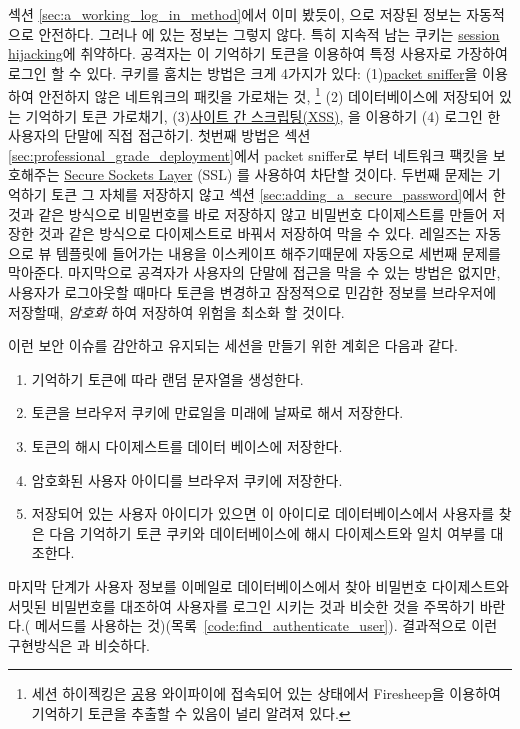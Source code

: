 섹션 \ref{sec:a_working_log_in_method}에서 이미 봤듯이, 으로 저장된 정보는 자동적으로 안전하다. 그러나 에 있는 정보는 그렇지 않다. 특히 지속적 남는 쿠키는 \href{http://en.wikipedia.org/wiki/Session_hijacking}{session hijacking}에 취약하다. 공격자는 이 기억하기 토큰을 이용하여 특정 사용자로 가장하여 로그인 할 수 있다. 쿠키를 훔치는 방법은 크게 4가지가 있다: (1)\href{https://en.wikipedia.org/wiki/Packet_analyzer}{packet sniffer}을 이용하여 안전하지 않은 네트워크의 패킷을 가로채는 것, \footnote{세션 하이젝킹은 \href{http://codebutler.com/firesheep}공용 와이파이에 접속되어 있는 상태에서 {Firesheep}을 이용하여 기억하기 토큰을 추출할 수 있음이 널리 알려져 있다.} (2) 데이터베이스에 저장되어 있는 기억하기 토큰 가로채기,  (3)\href{http://en.wikipedia.org/wiki/Cross-site_scripting}{사이트 간 스크립팅(XSS)}, 을 이용하기 (4) 로그인 한 사용자의 단말에 직접 접근하기. 첫번째 방법은 섹션 \ref{sec:professional_grade_deployment}에서 packet sniffer로 부터 네트워크 팩킷을 보호해주는 \href{https://en.wikipedia.org/wiki/Transport_Layer_Security}{Secure Sockets Layer} (SSL) 를 사용하여 차단할 것이다. 두번째 문제는 기억하기 토큰 그 자체를 저장하지 않고  섹션 \ref{sec:adding_a_secure_password}에서 한 것과 같은 방식으로 비밀번호를 바로 저장하지 않고 비밀번호 다이제스트를 만들어 저장한 것과 같은 방식으로 다이제스트로 바꿔서 저장하여 막을 수 있다. 레일즈는 자동으로 뷰 템플릿에 들어가는 내용을 이스케이프 해주기때문에 자동으로 세번째 문제를 막아준다. 마지막으로 공격자가 사용자의 단말에 접근을 막을 수 있는 방법은 없지만, 사용자가 로그아웃할 때마다 토큰을 변경하고 잠정적으로 민감한 정보를 브라우저에 저장할때, \emph{암호화 }하여 저장하여 위험을 최소화 할 것이다. 

이런 보안 이슈를 감안하고 유지되는 세션을 만들기 위한 계회은 다음과 같다. 

\begin{enumerate} \item 기억하기 토큰에 따라 랜덤 문자열을 생성한다. \item 토큰을 브라우저 쿠키에 만료일을 미래에 날짜로 해서 저장한다. \item 토큰의 해시 다이제스트를 데이터 베이스에 저장한다. \item 암호화된 사용자 아이디를 브라우저 쿠키에 저장한다. \item 저장되어 있는 사용자 아이디가 있으면 이 아이디로 데이터베이스에서 사용자를 찾은 다음 기억하기 토큰 쿠키와 데이터베이스에 해시 다이제스트와 일치 여부를 대조한다. \end{enumerate} 

\noindent 마지막 단계가 사용자 정보를 이메일로 데이터베이스에서 찾아 비밀번호 다이제스트와 서밋된 비밀번호를 대조하여 사용자를 로그인 시키는 것과 비슷한 것을 주목하기 바란다.( 메서드를 사용하는 것)(목록~\ref{code:find_authenticate_user}). 결과적으로 이런 구현방식은 과 비슷하다. 

